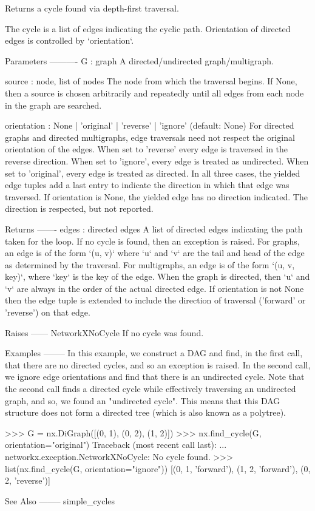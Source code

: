 \begin{DoxyVerb}Returns a cycle found via depth-first traversal.

The cycle is a list of edges indicating the cyclic path.
Orientation of directed edges is controlled by `orientation`.

Parameters
----------
G : graph
    A directed/undirected graph/multigraph.

source : node, list of nodes
    The node from which the traversal begins. If None, then a source
    is chosen arbitrarily and repeatedly until all edges from each node in
    the graph are searched.

orientation : None | 'original' | 'reverse' | 'ignore' (default: None)
    For directed graphs and directed multigraphs, edge traversals need not
    respect the original orientation of the edges.
    When set to 'reverse' every edge is traversed in the reverse direction.
    When set to 'ignore', every edge is treated as undirected.
    When set to 'original', every edge is treated as directed.
    In all three cases, the yielded edge tuples add a last entry to
    indicate the direction in which that edge was traversed.
    If orientation is None, the yielded edge has no direction indicated.
    The direction is respected, but not reported.

Returns
-------
edges : directed edges
    A list of directed edges indicating the path taken for the loop.
    If no cycle is found, then an exception is raised.
    For graphs, an edge is of the form `(u, v)` where `u` and `v`
    are the tail and head of the edge as determined by the traversal.
    For multigraphs, an edge is of the form `(u, v, key)`, where `key` is
    the key of the edge. When the graph is directed, then `u` and `v`
    are always in the order of the actual directed edge.
    If orientation is not None then the edge tuple is extended to include
    the direction of traversal ('forward' or 'reverse') on that edge.

Raises
------
NetworkXNoCycle
    If no cycle was found.

Examples
--------
In this example, we construct a DAG and find, in the first call, that there
are no directed cycles, and so an exception is raised. In the second call,
we ignore edge orientations and find that there is an undirected cycle.
Note that the second call finds a directed cycle while effectively
traversing an undirected graph, and so, we found an "undirected cycle".
This means that this DAG structure does not form a directed tree (which
is also known as a polytree).

>>> G = nx.DiGraph([(0, 1), (0, 2), (1, 2)])
>>> nx.find_cycle(G, orientation="original")
Traceback (most recent call last):
    ...
networkx.exception.NetworkXNoCycle: No cycle found.
>>> list(nx.find_cycle(G, orientation="ignore"))
[(0, 1, 'forward'), (1, 2, 'forward'), (0, 2, 'reverse')]

See Also
--------
simple_cycles
\end{DoxyVerb}
